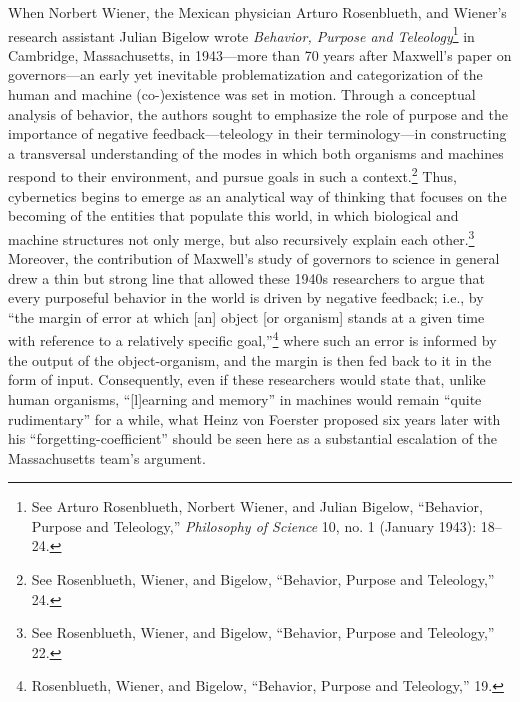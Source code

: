 \documentclass{tufte-handout}
\begin{document}
\enlargethispage{\baselineskip}

When Norbert Wiener, the Mexican physician Arturo Rosenblueth, and
Wiener's research assistant Julian Bigelow wrote \emph{Behavior, Purpose
and Teleology}\footnote{See Arturo Rosenblueth, Norbert Wiener, and
  Julian Bigelow, ``Behavior, Purpose and Teleology,'' \emph{Philosophy
  of Science} 10, no. 1 (January 1943): 18--24.} in Cambridge,
Massachusetts, in 1943---more than 70 years after Maxwell's paper on
governors---an early yet inevitable problematization and categorization
of the human and machine (co-)existence was set in motion. Through a
conceptual analysis of behavior, the authors sought to emphasize the
role of purpose and the importance of negative feedback---teleology in
their terminology---in constructing a transversal understanding of the
modes in which both organisms and machines respond to their environment,
and pursue goals in such a context.\footnote{See Rosenblueth, Wiener,
  and Bigelow, ``Behavior, Purpose and Teleology,'' 24.} Thus,
cybernetics begins to emerge as an analytical way of thinking that
focuses on the becoming of the entities that populate this world, in
which biological and machine structures not only merge, but also
recursively explain each other.\footnote{See Rosenblueth, Wiener, and
  Bigelow, ``Behavior, Purpose and Teleology,'' 22.} Moreover, the
contribution of Maxwell's study of governors to science in general drew
a thin but strong line that allowed these 1940s researchers to argue
that every purposeful behavior in the world is driven by negative
feedback; i.e., by ``the margin of error at which {[}an{]} object {[}or
organism{]} stands at a given time with reference to a relatively
specific goal,''\footnote{Rosenblueth, Wiener, and Bigelow, ``Behavior,
  Purpose and Teleology,'' 19.} where such an error is informed by the
output of the object-organism, and the margin is then fed back to it in
the form of input. Consequently, even if these researchers would state
that, unlike human organisms, ``{[}l{]}earning and memory'' in machines
would remain ``quite rudimentary'' for a while, what Heinz von Foerster
proposed six years later with his ``forgetting-coefficient'' should be
seen here as a substantial escalation of the Massachusetts team's
argument.
\end{document}
